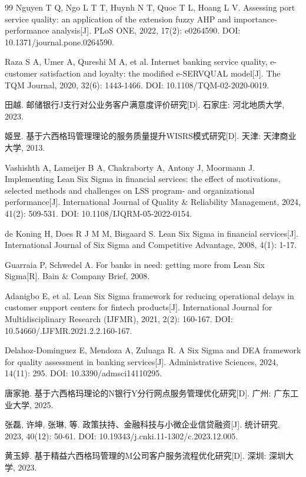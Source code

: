 \begin{thebibliography}{99}
 Nguyen T Q, Ngo L T T, Huynh N T, Quoc T L, Hoang L V. Assessing port service quality: an application of the extension fuzzy AHP and importance-performance analysis[J]. PLoS ONE, 2022, 17(2): e0264590. DOI: 10.1371/journal.pone.0264590.

 Raza S A, Umer A, Qureshi M A, et al. Internet banking service quality, e-customer satisfaction and loyalty: the modified e-SERVQUAL model[J]. The TQM Journal, 2020, 32(6): 1443-1466. DOI: 10.1108/TQM-02-2020-0019.

 田越. 邮储银行J支行对公业务客户满意度评价研究[D]. 石家庄: 河北地质大学, 2023.

 姬昱. 基于六西格玛管理理论的服务质量提升WISRS模式研究[D]. 天津: 天津商业大学, 2013.

 Vashishth A, Lameijer B A, Chakraborty A, Antony J, Moormann J. Implementing Lean Six Sigma in financial services: the effect of motivations, selected methods and challenges on LSS program- and organizational performance[J]. International Journal of Quality \& Reliability Management, 2024, 41(2): 509-531. DOI: 10.1108/IJQRM-05-2022-0154.

 de Koning H, Does R J M M, Bisgaard S. Lean Six Sigma in financial services[J]. International Journal of Six Sigma and Competitive Advantage, 2008, 4(1): 1-17.

 Guarraia P, Schwedel A. For banks in need: getting more from Lean Six Sigma[R]. Bain \& Company Brief, 2008.

 Adanigbo E, et al. Lean Six Sigma framework for reducing operational delays in customer support centers for fintech products[J]. International Journal for Multidisciplinary Research (IJFMR), 2021, 2(2): 160-167. DOI: 10.54660/.IJFMR.2021.2.2.160-167.

 Delahoz-Dominguez E, Mendoza A, Zuluaga R. A Six Sigma and DEA framework for quality assessment in banking services[J]. Administrative Sciences, 2024, 14(11): 295. DOI: 10.3390/admsci14110295.

 唐家驰. 基于六西格玛理论的N银行Y分行网点服务管理优化研究[D]. 广州: 广东工业大学, 2025.

 张磊, 许坤, 张琳, 等. 政策扶持、金融科技与小微企业信贷融资[J]. 统计研究, 2023, 40(12): 50-61. DOI: 10.19343/j.cnki.11-1302/c.2023.12.005.

 黄玉婷. 基于精益六西格玛管理的M公司客户服务流程优化研究[D]. 深圳: 深圳大学, 2023.


\end{thebibliography}
